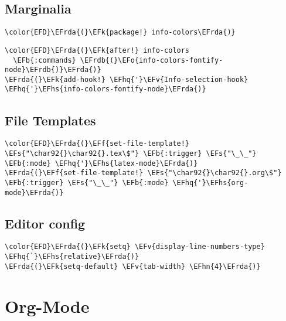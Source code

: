 \documentclass[12pt]{article}
\theoremstyle{plain}%
\theoremstyle{definition}
\theoremstyle{remark}
\newcommand{\EFs}[1]{\textcolor{EFs}{#1}} %
\newcommand{\EFk}[1]{\textcolor{EFk}{#1}} %
\newcommand{\EFb}[1]{\textcolor{EFb}{#1}} %
\newcommand{\EFf}[1]{\textcolor{EFf}{#1}} %
\newcommand{\EFv}[1]{\textcolor{EFv}{#1}} %
\newcommand{\EFo}[1]{\textcolor{EFo}{#1}} %
\newcommand{\EFhn}[1]{\textcolor{EFhn}{\textbf{#1}}} %
\newcommand{\EFhq}[1]{\textcolor{EFhq}{#1}} %
\newcommand{\EFhs}[1]{\textcolor{EFhs}{#1}} %
\newcommand{\EFrda}[1]{\textcolor{EFrda}{#1}} %
\newcommand{\EFrdb}[1]{\textcolor{EFrdb}{#1}} %
\begin{document}
\subsection{Marginalia}
\label{sec:orgcf96a63}
\begin{Code}
\begin{Verbatim}
\color{EFD}\EFrda{(}\EFk{package!} info-colors\EFrda{)}
\end{Verbatim}
\end{Code}
\begin{Code}
\begin{Verbatim}
\color{EFD}\EFrda{(}\EFk{after!} info-colors
  \EFb{:commands} \EFrdb{(}\EFo{info-colors-fontify-node}\EFrdb{)}\EFrda{)}
\EFrda{(}\EFk{add-hook!} \EFhq{'}\EFv{Info-selection-hook} \EFhq{'}\EFhs{info-colors-fontify-node}\EFrda{)}
\end{Verbatim}
\end{Code}
\subsection{File Templates}
\label{sec:org25a9eb6}
\begin{Code}
\begin{Verbatim}
\color{EFD}\EFrda{(}\EFf{set-file-template!} \EFs{"\char92{}\char92{}.tex\$"} \EFb{:trigger} \EFs{"\_\_"} \EFb{:mode} \EFhq{'}\EFhs{latex-mode}\EFrda{)}
\EFrda{(}\EFf{set-file-template!} \EFs{"\char92{}\char92{}.org\$"} \EFb{:trigger} \EFs{"\_\_"} \EFb{:mode} \EFhq{'}\EFhs{org-mode}\EFrda{)}
\end{Verbatim}
\end{Code}
\subsection{Editor config}
\label{sec:org28f8c56}
\begin{Code}
\begin{Verbatim}
\color{EFD}\EFrda{(}\EFk{setq} \EFv{display-line-numbers-type} \EFhq{`}\EFhs{relative}\EFrda{)}
\EFrda{(}\EFk{setq-default} \EFv{tab-width} \EFhn{4}\EFrda{)}
\end{Verbatim}
\end{Code}
\section{Org-Mode}
\label{sec:org230c2af}
\end{document}
